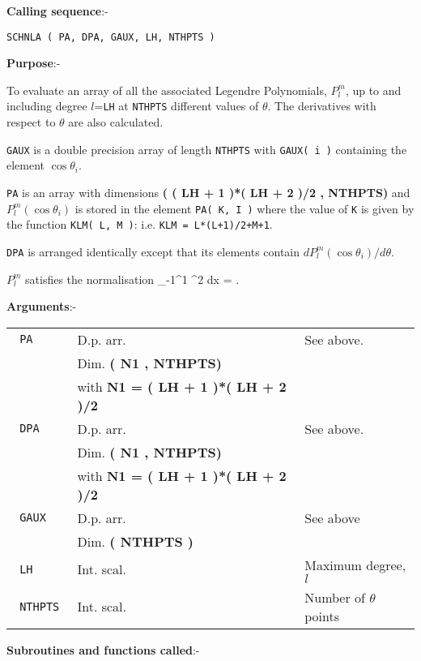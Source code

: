 {\bf Calling sequence}:-
\begin{verbatim}
SCHNLA ( PA, DPA, GAUX, LH, NTHPTS )
\end{verbatim}

{\bf Purpose}:- \newline

To evaluate an array of all the associated Legendre Polynomials,
$P_l^m$, up to and including degree $l$=\verb+LH+ at \verb+NTHPTS+
different values of $\theta$.
The derivatives with respect to $\theta$ are also calculated.

\verb+GAUX+ is a double precision array of length
\verb+NTHPTS+ with \verb+GAUX( i )+ containing the
element $\cos \theta_i$.

\verb+PA+ is an array with dimensions
{\bf ( ( LH + 1 )*( LH + 2 )/2 , NTHPTS)} and $P_l^m( \cos \theta_i )$
is stored in the element \verb+PA( K, I )+ where the value of
\verb+K+ is given by the function \verb+KLM( L, M )+:
i.e. \verb.KLM = L*(L+1)/2+M+1..

\verb+DPA+ is arranged identically except that its elements
contain $d P_l^m( \cos \theta_i )/ d\theta$.

$P_l^m$ satisfies the normalisation
\bed
\int_{-1}^{1} \left[ P_l^m(x) \right]^2 dx = .
\eed

{\bf Arguments}:- \newline

\begin{tabular}{|l|l|l|}
\hline
\verb+ PA + & D.p. arr. & See above. \\
& Dim. {\bf ( N1 , NTHPTS)} & \\
& with {\bf N1 = ( LH + 1 )*( LH + 2 )/2 } & \\
\hline
\verb+ DPA + & D.p. arr. & See above. \\
& Dim. {\bf ( N1 , NTHPTS)} & \\
& with {\bf N1 = ( LH + 1 )*( LH + 2 )/2 } & \\
\hline
\verb+ GAUX + & D.p. arr. & See above \\
& Dim. {\bf ( NTHPTS )} & \\
\hline
\verb+ LH + & Int. scal. & Maximum degree, $l$ \\
\hline
\verb+ NTHPTS + & Int. scal. & Number of $\theta$ points \\
\hline
\end{tabular} \newline

{\bf Subroutines and functions called}:- \newline

